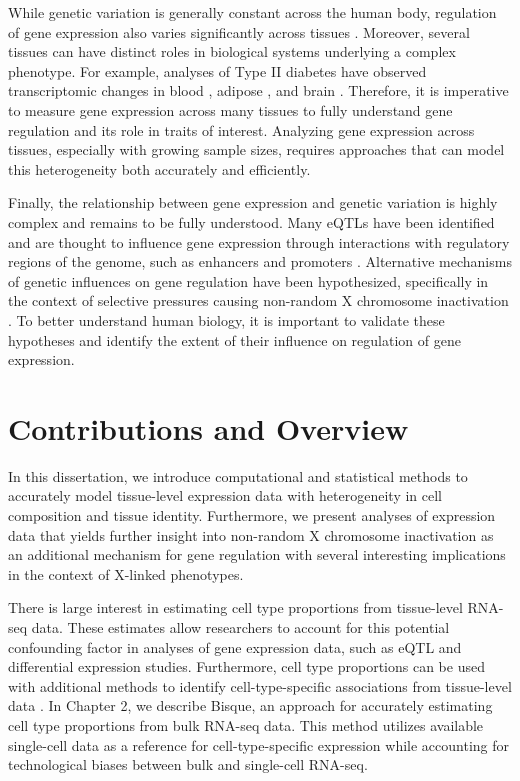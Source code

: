 While genetic variation is generally constant across the human body, regulation of gene expression also varies significantly across tissues \cite{GTEx_Consortium2020-xx}. Moreover, several tissues can have distinct roles in biological systems underlying a complex phenotype. For example, analyses of Type II diabetes have observed transcriptomic changes in blood \cite{Christodoulou2019}, adipose \cite{Miao2020}, and brain \cite{Zhou2019}. Therefore, it is imperative to measure gene expression across many tissues to fully understand gene regulation and its role in traits of interest. Analyzing gene expression across tissues, especially with growing sample sizes, requires approaches that can model this heterogeneity both accurately and efficiently.

Finally, the relationship between gene expression and genetic variation is highly complex \cite{robert2018exploring} and remains to be fully understood. Many eQTLs have been identified and are thought to influence gene expression through interactions with regulatory regions of the genome, such as enhancers and promoters \cite{Garieri2017}. Alternative mechanisms of genetic influences on gene regulation have been hypothesized, specifically in the context of selective pressures causing non-random X chromosome inactivation \cite{Migeon1998-gc}. To better understand human biology, it is important to validate these hypotheses and identify the extent of their influence on regulation of gene expression. 

\section{Contributions and Overview}
In this dissertation, we introduce computational and statistical methods to accurately model tissue-level expression data with heterogeneity in cell composition and tissue identity. Furthermore, we present analyses of expression data that yields further insight into non-random X chromosome inactivation as an additional mechanism for gene regulation with several interesting implications in the context of X-linked phenotypes.

There is large interest in estimating cell type proportions from tissue-level RNA-seq data. These estimates allow researchers to account for this potential confounding factor in analyses of gene expression data, such as eQTL and differential expression studies. Furthermore, cell type proportions can be used with additional methods to identify cell-type-specific associations from tissue-level data \cite{Shen-Orr2010-tg}. In Chapter 2, we describe Bisque, an approach for accurately estimating cell type proportions from bulk RNA-seq data. This method utilizes available single-cell data as a reference for cell-type-specific expression while accounting for technological biases between bulk and single-cell RNA-seq.

